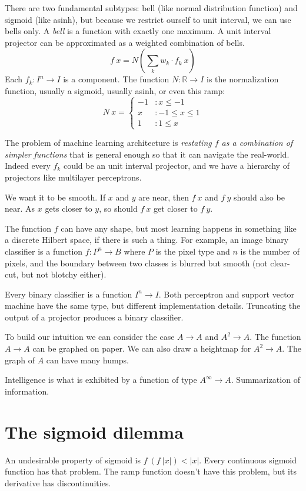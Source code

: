 There are two fundamental subtypes:
bell (like normal distribution function) and sigmoid (like asinh),
but because we restrict ourself to unit interval,
we can use bells only.
A \emph{bell} is a function with exactly one maximum.
A unit interval projector can be approximated as a weighted combination of bells.
\[
    f~x = N \left( \sum_k w_k \cdot f_k~x \right)
\]
Each \(f_k : I^n \to I\) is a component.
The function \(N : \mathbb{R} \to I\) is the normalization function,
usually a sigmoid, usually asinh,
or even this ramp:
\[
    N~x =
    \begin{cases}
        -1 & : x \le -1
        \\
        x & : -1 \le x \le 1
        \\
        1 & : 1 \le x
    \end{cases}
\]

The problem of machine learning architecture
is \emph{restating \(f\) as a combination of simpler functions}
that is general enough so that it can navigate the real-world.
Indeed every \(f_k\) could be an unit interval projector,
and we have a hierarchy of projectors
like multilayer perceptrons.

We want it to be smooth.
If \(x\) and \(y\) are near,
then \(f~x\) and \(f~y\) should also be near.
As \(x\) gets closer to \(y\), so should \(f~x\) get closer to \(f~y\).

The function \(f\) can have any shape,
but most learning happens in something like a discrete Hilbert space, if there is such a thing.
For example, an image binary classifier is a function \(f : P^n \to B\)
where \(P\) is the pixel type and \(n\) is the number of pixels,
and the boundary between two classes is blurred but smooth
(not clear-cut, but not blotchy either).

Every binary classifier is a function \(I^n \to I\).
Both perceptron and support vector machine have the same type,
but different implementation details.
Truncating the output of a projector produces a binary classifier.

To build our intuition we can consider the case \(A \to A\) and \(A^2 \to A\).
The function \(A \to A\) can be graphed on paper.
We can also draw a heightmap for \(A^2 \to A\).
The graph of \(A\) can have many humps.

Intelligence is what is exhibited by a function of type \(A^\infty \to A\).
Summarization of information.

\section{The sigmoid dilemma}

An undesirable property of sigmoid is \(f~(f~|x|) < |x|\).
Every continuous sigmoid function has that problem.
The ramp function doesn't have this problem,
but its derivative has discontinuities.
